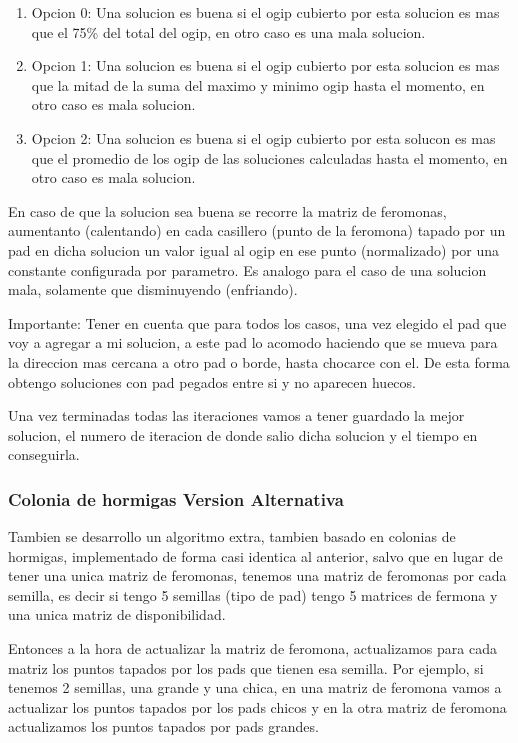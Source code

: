 \begin{enumerate}
\item Opcion 0: Una solucion es buena si el ogip cubierto por esta solucion es mas que el 75\% del total del ogip, en otro caso es una mala solucion.
\item Opcion 1: Una solucion es buena si el ogip cubierto por esta solucion es mas que la mitad de la suma del maximo y minimo ogip hasta el momento, en otro caso es mala solucion.
\item Opcion 2: Una solucion es buena si el ogip cubierto por esta solucon es mas que el promedio de los ogip de las soluciones calculadas hasta el momento, en otro caso es mala solucion. 
\end{enumerate}

En caso de que la solucion sea buena se recorre la matriz de feromonas, aumentanto (calentando) en cada casillero (punto de la feromona) tapado por un pad en dicha solucion un valor igual al ogip en ese punto (normalizado) por una constante configurada por parametro. Es analogo para el caso de una solucion mala, solamente que disminuyendo (enfriando).


Importante: Tener en cuenta que para todos los casos, una vez elegido el pad que voy a agregar a mi solucion, a este pad lo acomodo haciendo que se mueva para la direccion mas cercana a otro pad o borde, hasta chocarce con el. De esta forma obtengo soluciones con pad pegados entre si y no aparecen huecos.

Una vez terminadas todas las iteraciones vamos a tener guardado la mejor solucion, el numero de iteracion de donde salio dicha solucion y el tiempo en conseguirla.

\subsubsection{Colonia de hormigas Version Alternativa}

Tambien se desarrollo un algoritmo extra, tambien basado en colonias de hormigas, implementado de forma casi identica al anterior, salvo que en lugar de tener una unica matriz de feromonas, tenemos una matriz de feromonas por cada semilla, es decir si tengo 5 semillas (tipo de pad) tengo 5 matrices de fermona y una unica matriz de disponibilidad. 

Entonces a la hora de actualizar la matriz de feromona, actualizamos para cada matriz los puntos tapados por los pads que tienen esa semilla. Por ejemplo, si tenemos 2 semillas, una grande y una chica, en una matriz de feromona vamos a actualizar los puntos tapados por los pads chicos y en la otra matriz de feromona actualizamos los puntos tapados por pads grandes. 

